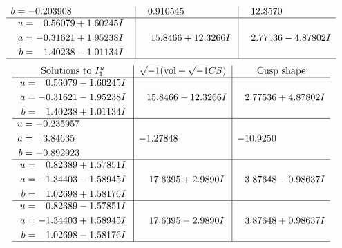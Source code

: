 \documentclass[1p]{elsarticle_modified}
\theoremstyle{definition}
\newcommand{\I}{\sqrt{-1}}
\begin{document}
$$\begin{array}{c|c|c}
\begin{aligned}
b &= -0.203908\phantom{ +0.000000I}\end{aligned}
 & \phantom{-}0.910545\phantom{ +0.000000I} & \phantom{-}12.3570\phantom{ +0.000000I} \\ \hline\begin{aligned}
u &= \phantom{-}0.56079 + 1.60245 I \\
a &= -0.31621 + 1.95238 I \\
b &= \phantom{-}1.40238 - 1.01134 I\end{aligned}
 & \phantom{-}15.8466 + 12.3266 I & \phantom{-}2.77536 - 4.87802 I\\
 \hline 
 \end{array}$$\newpage$$\begin{array}{c|c|c}  
\text{Solutions to }I^u_{1}& \I (\text{vol} + \sqrt{-1}CS) & \text{Cusp shape}\\
 \hline 
\begin{aligned}
u &= \phantom{-}0.56079 - 1.60245 I \\
a &= -0.31621 - 1.95238 I \\
b &= \phantom{-}1.40238 + 1.01134 I\end{aligned}
 & \phantom{-}15.8466 - 12.3266 I & \phantom{-}2.77536 + 4.87802 I \\ \hline\begin{aligned}
u &= -0.235957\phantom{ +0.000000I} \\
a &= \phantom{-}3.84635\phantom{ +0.000000I} \\
b &= -0.892923\phantom{ +0.000000I}\end{aligned}
 & -1.27848\phantom{ +0.000000I} & -10.9250\phantom{ +0.000000I} \\ \hline\begin{aligned}
u &= \phantom{-}0.82389 + 1.57851 I \\
a &= -1.34403 - 1.58945 I \\
b &= \phantom{-}1.02698 + 1.58176 I\end{aligned}
 & \phantom{-}17.6395 + 2.9890 I & \phantom{-}3.87648 - 0.98637 I \\ \hline\begin{aligned}
u &= \phantom{-}0.82389 - 1.57851 I \\
a &= -1.34403 + 1.58945 I \\
b &= \phantom{-}1.02698 - 1.58176 I\end{aligned}
 & \phantom{-}17.6395 - 2.9890 I & \phantom{-}3.87648 + 0.98637 I\\
 \hline 
 \end{array}$$\newpage\newpage\renewcommand{\arraystretch}{1}
\end{document}
